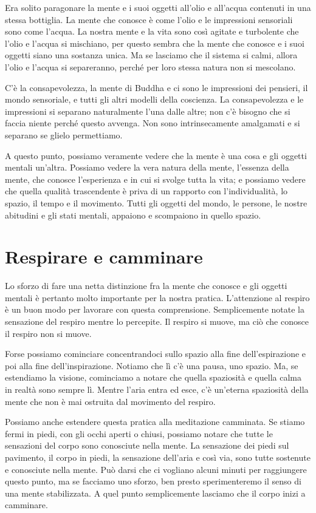 Era solito paragonare la mente e i suoi oggetti all'olio e all'acqua contenuti in una stessa bottiglia. La mente che conosce è come l'olio e le impressioni sensoriali sono come l'acqua. La nostra mente e la vita sono così agitate e turbolente che l'olio e l'acqua si mischiano, per questo sembra che la mente che conosce e i suoi oggetti siano una sostanza unica. Ma se lasciamo che il sistema si calmi, allora l'olio e l'acqua si separeranno, perché per loro stessa natura non si mescolano.

C'è la consapevolezza, la mente di Buddha e ci sono le impressioni dei pensieri, il mondo sensoriale, e tutti gli altri modelli della coscienza. La consapevolezza e le impressioni si separano naturalmente l'una dalle altre; non c'è bisogno che si faccia niente perché questo avvenga. Non sono intrinsecamente amalgamati e si separano se glielo permettiamo. 

A questo punto, possiamo veramente vedere che la mente è una cosa e gli oggetti mentali un'altra. Possiamo vedere la vera natura della mente, l'essenza della mente, che conosce l'esperienza e in cui si svolge tutta la vita; e possiamo vedere che quella qualità trascendente è priva di un rapporto con l'individualità, lo spazio, il tempo e il movimento. Tutti gli oggetti del mondo, le persone, le nostre abitudini e gli stati mentali, appaiono e scompaiono in quello spazio.

\section*{Respirare e camminare}

Lo sforzo di fare una netta distinzione fra la mente che conosce e gli oggetti mentali è pertanto molto importante per la nostra pratica. L'attenzione al respiro è un buon modo per lavorare con questa comprensione. Semplicemente notate la sensazione del respiro mentre lo percepite. Il respiro si muove, ma ciò che conosce il respiro non si muove. 

Forse possiamo cominciare concentrandoci sullo spazio alla fine dell'espirazione e poi alla fine dell'inspirazione. Notiamo che lì c'è una pausa, uno spazio. Ma, se estendiamo la visione, cominciamo a notare che quella spaziosità e quella calma in realtà sono sempre lì. Mentre l'aria entra ed esce, c'è un'eterna spaziosità della mente che non è mai ostruita dal movimento del respiro.

Possiamo anche estendere questa pratica alla meditazione camminata. Se stiamo fermi in piedi, con gli occhi aperti o chiusi, possiamo notare che tutte le sensazioni del corpo sono conosciute nella mente. La sensazione dei piedi sul pavimento, il corpo in piedi, la sensazione dell'aria e così via, sono tutte sostenute e conosciute nella mente. Può darsi che ci vogliano alcuni minuti per raggiungere questo punto, ma se facciamo uno sforzo, ben presto sperimenteremo il senso di una mente stabilizzata. A quel punto semplicemente lasciamo che il corpo inizi a camminare.

